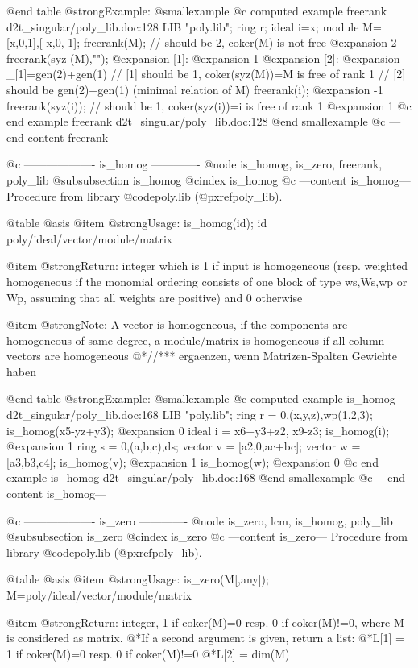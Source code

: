 @end table
@strong{Example:}
@smallexample
@c computed example freerank d2t_singular/poly_lib.doc:128 
LIB "poly.lib";
ring r;
ideal i=x;
module M=[x,0,1],[-x,0,-1];
freerank(M);          // should be 2, coker(M) is not free
@expansion{} 2
freerank(syz (M),"");
@expansion{} [1]:
@expansion{}    1
@expansion{} [2]:
@expansion{}    _[1]=gen(2)+gen(1)
// [1] should be 1, coker(syz(M))=M is free of rank 1
// [2] should be gen(2)+gen(1) (minimal relation of M)
freerank(i);
@expansion{} -1
freerank(syz(i));     // should be 1, coker(syz(i))=i is free of rank 1
@expansion{} 1
@c end example freerank d2t_singular/poly_lib.doc:128
@end smallexample
@c ---end content freerank---

@c ------------------- is_homog -------------
@node is_homog, is_zero, freerank, poly_lib
@subsubsection is_homog
@cindex is_homog
@c ---content is_homog---
Procedure from library @code{poly.lib} (@pxref{poly_lib}).

@table @asis
@item @strong{Usage:}
is_homog(id); id poly/ideal/vector/module/matrix

@item @strong{Return:}
integer which is 1 if input is homogeneous (resp. weighted homogeneous
if the monomial ordering consists of one block of type ws,Ws,wp or Wp,
assuming that all weights are positive) and 0 otherwise

@item @strong{Note:}
A vector is homogeneous, if the components are homogeneous of same
degree, a module/matrix is homogeneous if all column vectors are
homogeneous
@*//*** ergaenzen, wenn Matrizen-Spalten Gewichte haben

@end table
@strong{Example:}
@smallexample
@c computed example is_homog d2t_singular/poly_lib.doc:168 
LIB "poly.lib";
ring r = 0,(x,y,z),wp(1,2,3);
is_homog(x5-yz+y3);
@expansion{} 0
ideal i = x6+y3+z2, x9-z3;
is_homog(i);
@expansion{} 1
ring s = 0,(a,b,c),ds;
vector v = [a2,0,ac+bc];
vector w = [a3,b3,c4];
is_homog(v);
@expansion{} 1
is_homog(w);
@expansion{} 0
@c end example is_homog d2t_singular/poly_lib.doc:168
@end smallexample
@c ---end content is_homog---

@c ------------------- is_zero -------------
@node is_zero, lcm, is_homog, poly_lib
@subsubsection is_zero
@cindex is_zero
@c ---content is_zero---
Procedure from library @code{poly.lib} (@pxref{poly_lib}).

@table @asis
@item @strong{Usage:}
is_zero(M[,any]); M=poly/ideal/vector/module/matrix

@item @strong{Return:}
integer, 1 if coker(M)=0 resp. 0 if coker(M)!=0, where M is
considered as matrix.
@*If a second argument is given, return a list:
@*L[1] = 1 if coker(M)=0 resp. 0 if coker(M)!=0
@*L[2] = dim(M)

